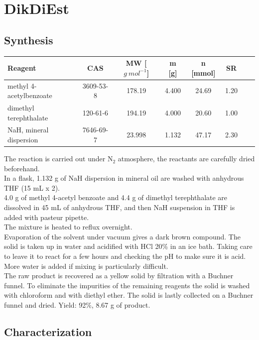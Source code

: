 \documentclass[../Master.tex]{subfiles}
\begin{document}
\section{DikDiEst}

\subsection{Synthesis}

\begin{center}
	\begin{tabular}[b]{lccccccc}
		\toprule
		Reagent                 & CAS       & MW  [\(g \ mol^{-1}\)] & m [g] & n [mmol] & SR   \\
		\midrule
		methyl 4-acetylbenzoate & 3609-53-8 & 178.19                 & 4.400 & 24.69    & 1.20 \\
		dimethyl terephthalate  & 120-61-6  & 194.19                 & 4.000 & 20.60    & 1.00 \\
		NaH, mineral dispersion & 7646-69-7 & 23.998                 & 1.132 & 47.17    & 2.30 \\
		\bottomrule
	\end{tabular}
\end{center}

The reaction is carried out under N$_{2}$ atmosphere, the reactants are carefully dried beforehand.\\
In a flask, 1.132 g of NaH dispersion in mineral oil are washed with anhydrous THF (15 mL x 2).\\
4.0 g of methyl 4-acetyl benzoate and 4.4 g of dimethyl terephthalate are dissolved in 45 mL of anhydrous THF, and then NaH suspension in THF is added with pasteur pipette.\\
The mixture is heated to reflux overnight. \\
Evaporation of the solvent under vacuum gives a dark brown compound. The solid is taken up in water and acidified with HCl 20\% in an ice bath. Taking care to leave it to react for a few hours and checking the pH to make sure it is acid. More water is added if mixing is particularly difficult.\\
The raw product is recovered as a yellow solid by filtration with a Buchner funnel.
To eliminate the impurities of the remaining reagents the solid is washed with chloroform and with diethyl ether. The solid is lastly collected on a Buchner funnel and dried. Yield: 92\%, 8.67 g of product.

\subsection{Characterization}
\end{document}
